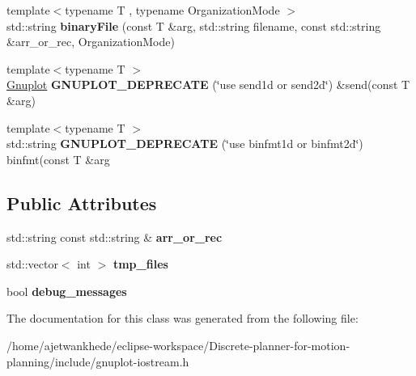 \begin{DoxyCompactItemize}
\item 
\mbox{\label{classgnuplotio_1_1Gnuplot_ad90501e6dbab5379abcd76fd0e2e4ef1}} 
{\footnotesize template$<$typename T , typename Organization\+Mode $>$ }\\std\+::string {\bfseries binary\+File} (const T \&arg, std\+::string filename, const std\+::string \&arr\+\_\+or\+\_\+rec, Organization\+Mode)
\item 
\mbox{\label{classgnuplotio_1_1Gnuplot_a4e730c762706c7235eb105bcb56ad185}} 
{\footnotesize template$<$typename T $>$ }\\\mbox{\hyperlink{classgnuplotio_1_1Gnuplot}{Gnuplot}} {\bfseries G\+N\+U\+P\+L\+O\+T\+\_\+\+D\+E\+P\+R\+E\+C\+A\+TE} (\char`\"{}use send1d or send2d\char`\"{}) \&send(const T \&arg)
\item 
\mbox{\label{classgnuplotio_1_1Gnuplot_aeb3ba94ed04ecd46b55f89591ba23e7c}} 
{\footnotesize template$<$typename T $>$ }\\std\+::string {\bfseries G\+N\+U\+P\+L\+O\+T\+\_\+\+D\+E\+P\+R\+E\+C\+A\+TE} (\char`\"{}use binfmt1d or binfmt2d\char`\"{}) binfmt(const T \&arg
\end{DoxyCompactItemize}
\subsection*{Public Attributes}
\begin{DoxyCompactItemize}
\item 
\mbox{\label{classgnuplotio_1_1Gnuplot_a2d194dbd4d2f3475ff6f9b8384e62a9f}} 
std\+::string const std\+::string \& {\bfseries arr\+\_\+or\+\_\+rec}
\item 
\mbox{\label{classgnuplotio_1_1Gnuplot_a92a4f6322e486de17db4507a5fc77348}} 
std\+::vector$<$ int $>$ {\bfseries tmp\+\_\+files}
\item 
\mbox{\label{classgnuplotio_1_1Gnuplot_a63e08bfd0cd02937d895ecfb6180107c}} 
bool {\bfseries debug\+\_\+messages}
\end{DoxyCompactItemize}


The documentation for this class was generated from the following file\+:\begin{DoxyCompactItemize}
\item 
/home/ajetwankhede/eclipse-\/workspace/\+Discrete-\/planner-\/for-\/motion-\/planning/include/gnuplot-\/iostream.\+h\end{DoxyCompactItemize}
